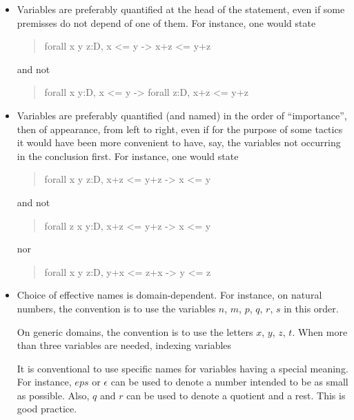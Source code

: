 \documentclass[a4paper]{article}
\begin{document}
\begin{itemize}

\item Variables are preferably quantified at the head of the
  statement, even if some premisses do not depend of one of them. For
  instance, one would state
\begin{quote}
\begin{tt}
  {forall x y z:D, x <= y -> x+z <= y+z}
\end{tt}
\end{quote}
and not
\begin{quote}
\begin{tt}
  {forall x y:D, x <= y -> forall z:D, x+z <= y+z}
\end{tt}
\end{quote}

\item Variables are preferably quantified (and named) in the order of
  ``importance'', then of appearance, from left to right, even if
  for the purpose of some tactics it would have been more convenient
  to have, say, the variables not occurring in the conclusion
  first. For instance, one would state
\begin{quote}
\begin{tt}
  {forall x y z:D, x+z <= y+z -> x <= y}
\end{tt}
\end{quote}
and not
\begin{quote}
\begin{tt}
  {forall z x y:D, x+z <= y+z -> x <= y}
\end{tt}
\end{quote}
nor
\begin{quote}
\begin{tt}
  {forall x y z:D, y+x <= z+x -> y <= z}
\end{tt}
\end{quote}

\item Choice of effective names is domain-dependent. For instance, on
  natural numbers, the convention is to use the variables $n$, $m$,
  $p$, $q$, $r$, $s$ in this order.

  On generic domains, the convention is to use the letters $x$, $y$,
  $z$, $t$. When more than three variables are needed, indexing variables

  It is conventional to use specific names for variables having a
  special meaning. For instance, $eps$ or $\epsilon$ can be used to
  denote a number intended to be as small as possible. Also, $q$ and
  $r$ can be used to denote a quotient and a rest. This is good
  practice.

\end{itemize}
\end{document}
